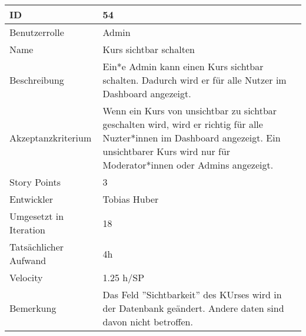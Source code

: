 \begin{tabularx}{\textwidth}{|p{}|X|}
	\hline
	ID & 54\\
	\hline
	Benutzerrolle & Admin\\
	\hline
	Name & Kurs sichtbar schalten\\
	\hline
	Beschreibung & Ein*e Admin kann einen Kurs sichtbar schalten. Dadurch wird er für alle Nutzer im Dashboard angezeigt.\\
	\hline
	Akzeptanzkriterium & Wenn ein Kurs von unsichtbar zu sichtbar geschalten wird, wird er richtig für alle Nuzter*innen im Dashboard angezeigt. Ein unsichtbarer Kurs wird nur für Moderator*innen oder Admins angezeigt.\\
	\hline
	Story Points & 3\\
	\hline
	Entwickler & Tobias Huber\\
	\hline
	Umgesetzt in Iteration & 18\\
	\hline
	Tatsächlicher Aufwand & 4h\\
	\hline
	Velocity & 1.25 h/SP\\
	\hline
	Bemerkung & Das Feld ''Sichtbarkeit'' des KUrses wird in der Datenbank geändert. Andere daten sind davon nicht betroffen.\\
	\hline
\end{tabularx}
\vspace{20pt}
